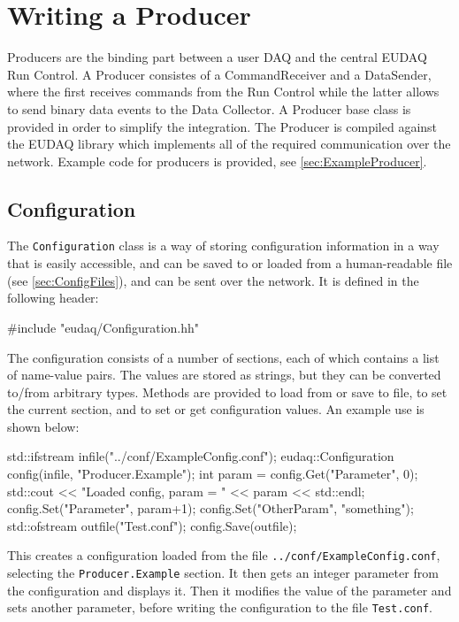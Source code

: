 \section{Writing a Producer}\label{sec:Producers}
Producers are the binding part between a user DAQ and the central EUDAQ Run Control.
A Producer consistes of a CommandReceiver and a DataSender, where the first receives commands from the Run Control while the latter allows to send binary data events to the Data Collector.
A Producer base class is provided in order to simplify the integration.
The Producer is compiled against the EUDAQ library which implements all of the required communication over the network.
Example code for producers is provided, see \autoref{sec:ExampleProducer}.

\subsection{Configuration}
The \texttt{Configuration} class is a way of storing configuration information
in a way that is easily accessible, and can be saved to or loaded from a human-readable file
(see \autoref{sec:ConfigFiles}), and can be sent over the network.
It is defined in the following header:

\begin{listing}
#include "eudaq/Configuration.hh"
\end{listing}

The configuration consists of a number of sections,
each of which contains a list of name-value pairs.
The values are stored as strings, but they can be converted to/from arbitrary types.
Methods are provided to load from or save to file, to set the current section,
and to set or get configuration values.
An example use is shown below:

\begin{listing}
std::ifstream infile("../conf/ExampleConfig.conf");
eudaq::Configuration config(infile, "Producer.Example");
int param = config.Get("Parameter", 0);
std::cout << "Loaded config, param = " << param << std::endl;
config.Set("Parameter", param+1);
config.Set("OtherParam", "something");
std::ofstream outfile("Test.conf");
config.Save(outfile);
\end{listing}

This creates a configuration loaded from the file \texttt{../conf/ExampleConfig.conf},
selecting the \texttt{Producer.Example} section.
It then gets an integer parameter from the configuration and displays it.
Then it modifies the value of the parameter and sets another parameter,
before writing the configuration to the file \texttt{Test.conf}.

